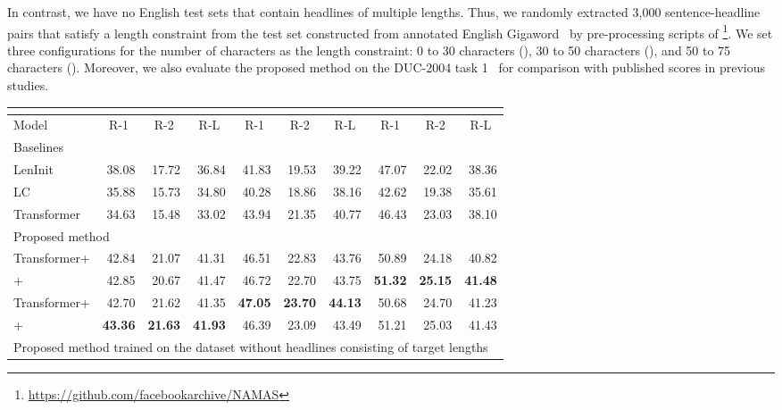 \documentclass[11pt,a4paper]{article}
\begin{document}
In contrast, we have no English test sets that contain headlines of multiple lengths.
Thus, we randomly extracted 3,000 sentence-headline pairs that satisfy a length constraint from the test set constructed from annotated English Gigaword~\cite{napoles:2012:AG} by pre-processing scripts of \footnote{\href{https://github.com/facebookarchive/NAMAS}{https://github.com/facebookarchive/NAMAS}}.
We set three configurations for the number of characters as the length constraint: 0 to 30 characters (), 30 to 50 characters (), and 50 to 75 characters ().
Moreover, we also evaluate the proposed method on the DUC-2004 task 1~\cite{Over:2007:DC:1284916.1285157} for comparison with published scores in previous studies.


\begin{table*}[!t]
  \centering
  \footnotesize
  \begin{tabular}{| l | r r r | r r r | r r r |} \hline
  & \multicolumn{3}{|c|}{} & \multicolumn{3}{c|}{} & \multicolumn{3}{c|}{} \\ \hline
  Model & \multicolumn{1}{c}{R-1} & \multicolumn{1}{c}{R-2} & \multicolumn{1}{c|}{R-L} & \multicolumn{1}{c}{R-1} & \multicolumn{1}{c}{R-2} & \multicolumn{1}{c|}{R-L} & \multicolumn{1}{c}{R-1} & \multicolumn{1}{c}{R-2} & \multicolumn{1}{c|}{R-L} \\ \hline
  \multicolumn{10}{|l|}{Baselines} \\ \hline
  LenInit & 38.08 & 17.72 & 36.84 & 41.83 & 19.53 & 39.22 & 47.07 & 22.02 & 38.36 \\
  LC & 35.88 & 15.73 & 34.80 & 40.28 & 18.86 & 38.16 & 42.62 & 19.38 & 35.61 \\
  Transformer & 34.63 & 15.48 & 33.02 & 43.94 & 21.35 & 40.77 & 46.43 & 23.03 & 38.10 \\ \hline
  \multicolumn{10}{|l|}{Proposed method} \\ \hline
  Transformer+ & 42.84 & 21.07 & 41.31 & 46.51 & 22.83 & 43.76 & 50.89 & 24.18 & 40.82 \\
  + & 42.85 & 20.67 & 41.47 & 46.72 & 22.70 & 43.75 & {\bf 51.32} & {\bf 25.15} & {\bf 41.48} \\
  Transformer+ & 42.70 & 21.62 & 41.35 & {\bf 47.05} & {\bf 23.70} & {\bf 44.13} & 50.68 & 24.70 & 41.23 \\
  + & {\bf 43.36} & {\bf 21.63} & {\bf 41.93} & 46.39 & 23.09 & 43.49 & 51.21 & 25.03 & 41.43 \\ \hline
  \multicolumn{10}{|l|}{Proposed method trained on the dataset without headlines consisting of target lengths} \\ \hline

\end{tabular}
\end{table*}
\end{document}
